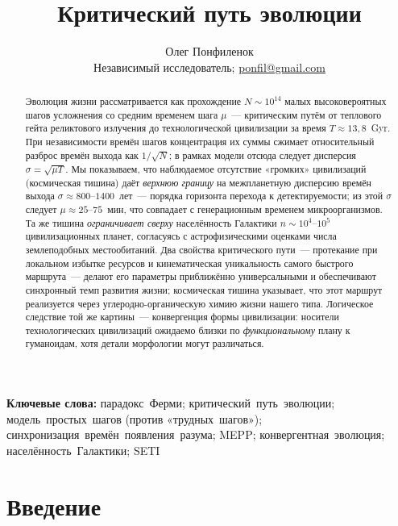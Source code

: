 \documentclass[12pt,a4paper]{article}
\title{\textbf{Критический путь эволюции}}
\author{%
  Олег Понфиленок\\[0.35em]%
  {\normalsize Независимый исследователь; \href{mailto:ponfil@gmail.com}{ponfil@gmail.com}}%
}
\date{}
\begin{document}
\pagecolor{black}
\color{white}

\maketitle

\begin{abstract}
Эволюция жизни рассматривается как прохождение $N \sim 10^{14}$ малых высоковероятных шагов усложнения со средним временем шага $\mu$~--- критическим путём от теплового гейта реликтового излучения до технологической цивилизации за время $T \approx 13{,}8$~Gyr. При независимости времён шагов концентрация их суммы сжимает относительный разброс времён выхода как $1/\sqrt{N}$; в рамках модели отсюда следует дисперсия $\sigma = \sqrt{\mu T}$. Мы показываем, что наблюдаемое отсутствие «громких» цивилизаций (космическая тишина) даёт \emph{верхнюю границу} на межпланетную дисперсию времён выхода $\sigma \approx 800$--$1400$~лет~--- порядка горизонта перехода к детектируемости; из этой $\sigma$ следует $\mu \approx 25$--$75$~мин, что совпадает с генерационным временем микроорганизмов. Та же тишина \emph{ограничивает сверху} населённость Галактики $n \sim 10^4$--$10^5$ цивилизационных планет, согласуясь с астрофизическими оценками числа землеподобных местообитаний. Два свойства критического пути~--- протекание при локальном избытке ресурсов и кинематическая уникальность самого быстрого маршрута~--- делают его параметры приближённо универсальными и обеспечивают синхронный темп развития жизни; космическая тишина указывает, что этот маршрут реализуется через углеродно-органическую химию жизни нашего типа. Логическое следствие той же картины~--- конвергенция формы цивилизации: носители технологических цивилизаций ожидаемо близки по \emph{функциональному} плану к гуманоидам, хотя детали морфологии могут различаться.
\end{abstract}

\noindent\textbf{Ключевые слова:} парадокс~Ферми; критический~путь~эволюции; модель~простых~шагов (против «трудных~шагов»); синхронизация~времён~появления~разума; MEPP; конвергентная~эволюция; населённость~Галактики; SETI

\section{Введение}
\end{document}
